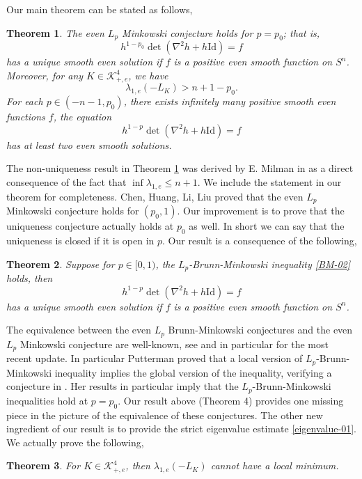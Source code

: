 \documentclass[reqno]{amsart}
\theoremstyle{remark}
\def\cK{{\mathcal K}}
\theoremstyle{plain}
\newtheorem{thm}{Theorem}
\begin{document}
Our main theorem can be stated as follows,
\begin{thm}\label{main}
    The even $L_p$ Minkowski conjecture holds for $p=p_0$; that is, 
     \[
    h^{1-p_0}\det(\nabla^2 h+h\text{Id})=f
    \]
    has a unique smooth even solution if $f$ is a positive even smooth function on $S^n$.  Moreover, for any $K\in \cK^4_{+, e}$, we have
    \begin{equation}\label{eigenvalue-01}
    \lambda_{1, e}(-L_K)>n+1-p_0. 
    \end{equation}
    For each  $p\in (-n-1, p_0)$, there exists infinitely many positive smooth even functions $f$, the equation
    \[
    h^{1-p}\det(\nabla^2 h+h\text{Id})=f
    \]
    has at least two even smooth solutions. 
\end{thm}
The non-uniqueness result in Theorem \ref{main} was derived by E. Milman in \cite[Corollary 1.5]{Milman22} as a direct consequence of the fact that $\inf\lambda_{1, e}\leq n+1$.  We include the statement in our theorem for completeness. 
Chen, Huang, Li, Liu \cite{CHLL} proved that the even $L_p$ Minkowski conjecture holds for $(p_0, 1)$. Our improvement is to prove that the uniqueness conjecture actually holds at $p_0$ as well. In short we can say that the uniqueness is closed if it is open in $p$.  
Our result is a consequence of the following,  
\begin{thm}Suppose for $p\in [0, 1)$, the $L_p$-Brunn-Minkowski inequality \eqref{BM-02} holds, then 
\[
h^{1-p}\det(\nabla^2h+h\text{Id})=f
\]
has a unique smooth even solution if $f$ is a positive even smooth function on $S^n$. 
\end{thm}
The equivalence between the even $L_p$ Brunn-Minkowski conjectures and the even $L_p$ Minkowski conjecture are well-known, see \cite{BLYZ01} and  in particular \cite[Theorem 1.1, Theorem 2.1]{Milman23} for the most recent update. 
In particular Putterman \cite[Proposition 1.5]{Put} proved that a local version of $L_p$-Brunn-Minkowski inequality implies the global version of the inequality, verifying a conjecture in \cite{KM01}. Her results in particular imply that 
the $L_p$-Brunn-Minkowski inequalities hold at $p=p_0$. 
Our result above (Theorem 4) provides one missing piece in the picture of the equivalence of these conjectures. 
The other new ingredient of our result is to provide the strict eigenvalue estimate \eqref{eigenvalue-01}. We actually prove the following,
\begin{thm}
    For $K\in \cK^4_{+, e}$, then $\lambda_{1, e}(-L_K)$ cannot have a local minimum. 
\end{thm}
\end{document}
